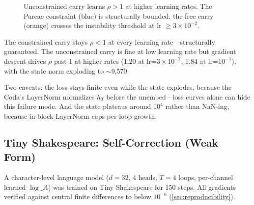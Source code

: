 \documentclass[11pt]{article}
\begin{document}
\begin{figure}[ht]
\centering
{}
\caption{Unconstrained carry learns $\rho > 1$ at higher learning rates. The Parcae constraint (blue) is structurally bounded; the free carry (orange) crosses the instability threshold at lr $\geq 3 \times 10^{-2}$.}
\label{fig:unconstrained-carry}
\end{figure}

The constrained carry stays $\rho < 1$ at every learning rate---structurally guaranteed. The unconstrained carry is fine at low learning rate but gradient descent drives $\rho$ past 1 at higher rates (1.20 at lr=$3 \times 10^{-2}$, 1.84 at lr=$10^{-1}$), with the state norm exploding to $\sim$9,570.

Two caveats: the loss stays finite even while the state explodes, because the Coda's LayerNorm normalizes $h_T$ before the unembed---loss curves alone can hide this failure mode. And the state plateaus around $10^4$ rather than NaN-ing, because in-block LayerNorm caps per-loop growth.

\subsection{Tiny Shakespeare: Self-Correction (Weak Form)}
\label{subsec:tinyshakes}

A character-level language model ($d=32$, 4 heads, $T=4$ loops, per-channel learned $\log\_A$) was trained on Tiny Shakespeare for 150 steps. All gradients verified against central finite differences to below $10^{-6}$ (\cref{sec:reproducibility}).
\end{document}
